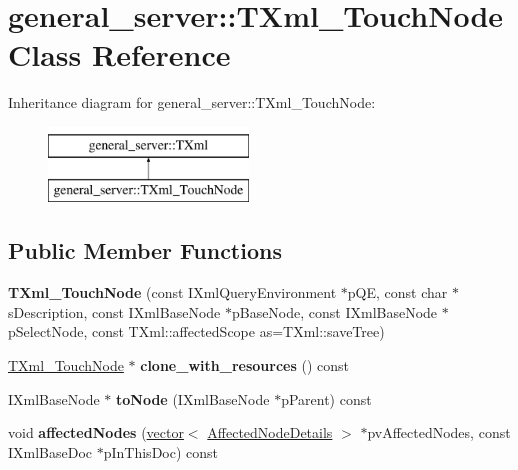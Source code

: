 \hypertarget{classgeneral__server_1_1TXml__TouchNode}{\section{general\-\_\-server\-:\-:\-T\-Xml\-\_\-\-Touch\-Node \-Class \-Reference}
\label{classgeneral__server_1_1TXml__TouchNode}
}
\-Inheritance diagram for general\-\_\-server\-:\-:\-T\-Xml\-\_\-\-Touch\-Node\-:\begin{figure}[H]
\begin{center}
\leavevmode
\includegraphics[height=2.000000cm]{classgeneral__server_1_1TXml__TouchNode}
\end{center}
\end{figure}
\subsection*{\-Public \-Member \-Functions}
\begin{DoxyCompactItemize}
\item 
\hypertarget{classgeneral__server_1_1TXml__TouchNode_a191fd9c5f1f0fc0cee045b16bdd7cf99}{{\bfseries \-T\-Xml\-\_\-\-Touch\-Node} (const \-I\-Xml\-Query\-Environment $\ast$p\-Q\-E, const char $\ast$s\-Description, const \-I\-Xml\-Base\-Node $\ast$p\-Base\-Node, const \-I\-Xml\-Base\-Node $\ast$p\-Select\-Node, const \-T\-Xml\-::affected\-Scope as=\-T\-Xml\-::save\-Tree)}\label{classgeneral__server_1_1TXml__TouchNode_a191fd9c5f1f0fc0cee045b16bdd7cf99}

\item 
\hypertarget{classgeneral__server_1_1TXml__TouchNode_a5f0bf6b229a8091eac2da9817cf39cbc}{\hyperlink{classgeneral__server_1_1TXml__TouchNode}{\-T\-Xml\-\_\-\-Touch\-Node} $\ast$ {\bfseries clone\-\_\-with\-\_\-resources} () const }\label{classgeneral__server_1_1TXml__TouchNode_a5f0bf6b229a8091eac2da9817cf39cbc}

\item 
\hypertarget{classgeneral__server_1_1TXml__TouchNode_ad0b159609e7a28a314188b0490c2aa7f}{\-I\-Xml\-Base\-Node $\ast$ {\bfseries to\-Node} (\-I\-Xml\-Base\-Node $\ast$p\-Parent) const }\label{classgeneral__server_1_1TXml__TouchNode_ad0b159609e7a28a314188b0490c2aa7f}

\item 
\hypertarget{classgeneral__server_1_1TXml__TouchNode_ae1584bd8c5aea099036e9ac2b92ed886}{void {\bfseries affected\-Nodes} (\hyperlink{classvector}{vector}$<$ \hyperlink{structgeneral__server_1_1TXml_1_1AffectedNodeDetails}{\-Affected\-Node\-Details} $>$ $\ast$pv\-Affected\-Nodes, const \-I\-Xml\-Base\-Doc $\ast$p\-In\-This\-Doc) const }\label{classgeneral__server_1_1TXml__TouchNode_ae1584bd8c5aea099036e9ac2b92ed886}

\end{DoxyCompactItemize}
